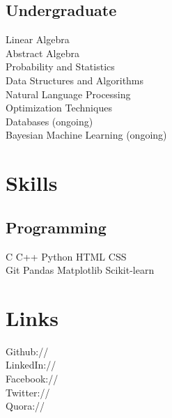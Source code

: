 \documentclass[]{deedy-resume-openfont}
\begin{document}
\begin{minipage}[t]{0.33\textwidth}
\subsection{Undergraduate}
Linear Algebra \\
Abstract Algebra \\
Probability and Statistics \\
Data Structures and Algorithms \\
Natural Language Processing \\
Optimization Techniques \\
Databases (ongoing) \\
Bayesian Machine Learning (ongoing) \\

\sectionsep


\section{Skills}
\subsection{Programming}
C \textbullet{}   C++ \textbullet{} Python \textbullet{} HTML \textbullet{} CSS \\ 
Git \textbullet{} Pandas \textbullet{} Matplotlib \textbullet{} Scikit-learn
\sectionsep


\section{Links} 
Github:// \href{https://github.com/pratik1105}{} \\
LinkedIn://  \href{https://www.linkedin.com/in/pratik1105}{} \\
Facebook://  \href{https://www.facebook.com/pratik.mishra.9}{} \\
Twitter://  \href{https://twitter.com/pratikmishra001}{} \\
Quora://  \href{https://www.quora.com/profile/Pratik-Mishra-8}{}
\sectionsep

%
%

\end{minipage} 
\end{document}
